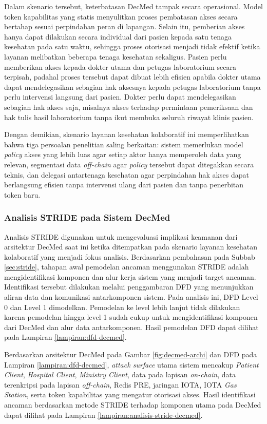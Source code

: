 \documentclass[bahasa, 12pt, a4paper, onecolumn, oneside, final]{report}
\begin{document}
Dalam skenario tersebut, keterbatasan DecMed tampak secara operasional. Model token kapabilitas yang statis menyulitkan proses pembatasan akses secara bertahap sesuai perpindahan peran di lapangan. Selain itu, pemberian akses hanya dapat dilakukan secara individual dari pasien kepada satu tenaga kesehatan pada satu waktu, sehingga proses otorisasi menjadi tidak efektif ketika layanan melibatkan beberapa tenaga kesehatan sekaligus. Pasien perlu memberikan akses kepada dokter utama dan petugas laboratorium secara terpisah, padahal proses tersebut dapat dibuat lebih efisien apabila dokter utama dapat mendelegasikan sebagian hak aksesnya kepada petugas laboratorium tanpa perlu intervensi langsung dari pasien. Dokter perlu dapat mendelegasikan sebagian hak akses saja, misalnya akses terhadap permintaan pemeriksaan dan hak tulis hasil laboratorium tanpa ikut membuka seluruh riwayat klinis pasien.

Dengan demikian, skenario layanan kesehatan kolaboratif ini memperlihatkan bahwa tiga persoalan penelitian saling berkaitan: sistem memerlukan model \textit{policy} akses yang lebih luas agar setiap aktor hanya memperoleh data yang relevan, segmentasi data \textit{off-chain} agar \textit{policy} tersebut dapat ditegakkan secara teknis, dan delegasi antartenaga kesehatan agar perpindahan hak akses dapat berlangsung efisien tanpa intervensi ulang dari pasien dan tanpa penerbitan token baru.
\subsubsection{Analisis STRIDE pada Sistem DecMed}
\label{subsec:analisis-stride-decmed}

Analisis STRIDE digunakan untuk mengevaluasi implikasi keamanan dari arsitektur DecMed saat ini ketika ditempatkan pada skenario layanan kesehatan kolaboratif yang menjadi fokus analisis. Berdasarkan pembahasan pada Subbab \ref{sec:stride}, tahapan awal pemodelan ancaman menggunakan STRIDE adalah mengidentifikasi komponen dan alur kerja sistem yang menjadi target ancaman. Identifikasi tersebut dilakukan melalui penggambaran DFD yang menunjukkan aliran data dan komunikasi antarkomponen sistem. Pada analisis ini, DFD Level 0 dan Level 1 dimodelkan. Pemodelan ke level lebih lanjut tidak dilakukan karena pemodelan hingga level 1 sudah cukup untuk mengidentifikasi komponen dari DecMed dan alur data antarkomponen. Hasil pemodelan DFD dapat dilihat pada Lampiran \ref{lampiran:dfd-decmed}.

Berdasarkan arsitektur DecMed pada Gambar \ref{fig:decmed-archi} dan DFD pada Lampiran \ref{lampiran:dfd-decmed}, \textit{attack surface} utama sistem mencakup \textit{Patient Client}, \textit{Hospital Client}, \textit{Ministry Client}, data pada lapisan \textit{on-chain}, data terenkripsi pada lapisan \textit{off-chain}, Redis PRE, jaringan IOTA, IOTA \textit{Gas Station}, serta token kapabilitas yang mengatur otorisasi akses. Hasil identifikasi ancaman berdasarkan metode STRIDE terhadap komponen utama pada DecMed dapat dilihat pada Lampiran \ref{lampiran:analisis-stride-decmed}.
\end{document}
